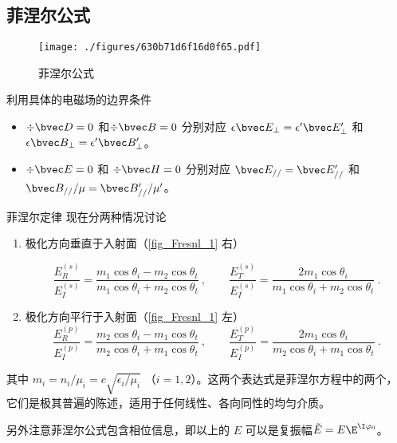 
\begin{issues}
\issueTODO
\end{issues}


\subsection{菲涅尔公式}
\begin{figure}[ht]
\centering
\texttt{[image: ./figures/630b71d6f16d0f65.pdf]}
\caption{菲涅尔公式} \label{fig_Fresnl_1}
\end{figure}
 
利用具体的电磁场的边界条件 %
\begin{itemize}
\item $\div \bvec D = 0$ 和$\div \bvec B = 0$  分别对应 $\epsilon \bvec E_\bot = \epsilon' \bvec E'_\bot$ 和 $\epsilon \bvec B_\bot = \epsilon' \bvec B'_\bot$。

\item $\div \bvec E = 0$ 和 $\div \bvec H = 0$ 分别对应 $\bvec E_{//} = \bvec E'_{//}$ 和 $\bvec B_{//}/\mu = \bvec B'_{//}/\mu'$。
\end{itemize}

\begin{theorem}{菲涅尔定律}
现在分两种情况讨论
\begin{enumerate}
\item 极化方向垂直于入射面（\autoref{fig_Fresnl_1} 右）

\begin{equation}
\frac{E_R^{(s)}}{E_I^{(s)}} =  \frac{m_1\cos{\theta_i} - m_2\cos\theta_t}{m_1\cos\theta_i + m_2\cos\theta_t}~,
\qquad
\frac{E_T^{(s)}}{E_I^{(s)}} = \frac{2 m_1\cos\theta_i}{m_1\cos\theta_i + m_2\cos\theta_t}~.
\end{equation}

\item 极化方向平行于入射面（\autoref{fig_Fresnl_1} 左）
\begin{equation}\label{eq_Fresnl_2}
\frac{E_R^{(p)}}{E_I^{(p)}} =  \frac{m_2\cos\theta_i - m_1\cos\theta_t}{m_2 \cos\theta_i + m_1\cos\theta_t}~,
\qquad
\frac{E_T^{(p)}}{E_I^{(p)}} =  \frac{2 m_1\cos\theta_i}{m_2\cos\theta_i + m_1\cos\theta_t}~.
\end{equation}
\end{enumerate}
其中 $m_i=n_i/\mu_i = c\sqrt{\epsilon_i/\mu_i}$ （$i=1,2$）。这两个表达式是菲涅尔方程中的两个，它们是极其普遍的陈述，适用于任何线性、各向同性的均匀介质。

另外注意菲涅尔公式包含相位信息，即以上的 $E$ 可以是复振幅$\tilde E=E \E^{\I \varphi_0}$。 
\end{theorem}

